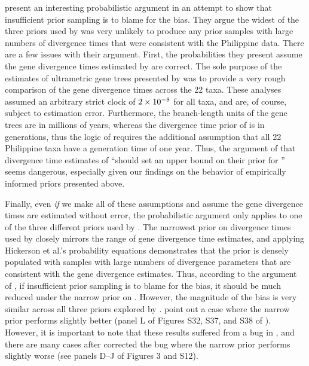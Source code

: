 \documentclass[letterpaper,12pt]{article}
\begin{document}
\begin{linenumbers}
\citet{Hickerson2013} present an interesting probabilistic argument in an
attempt to show that insufficient prior sampling is to blame for the bias.
They argue the widest of the three priors used by \citet{Oaks2012} was very
unlikely to produce any prior samples with large numbers of divergence times
that were consistent with the Philippine data.
There are a few issues with their argument.
First, the probabilities they present assume the gene divergence times
estimated by \citet{Oaks2012} are correct.
The sole purpose of the estimates of ultrametric gene trees presented by
\citet{Oaks2012} was to provide a very rough comparison of the gene divergence
times across the 22 taxa.  These analyses assumed an arbitrary strict clock of
$2\times 10^{-8}$ for all taxa, and are, of course, subject to estimation error.
Furthermore, the branch-length units of the gene trees are in millions of
years, whereas the divergence time prior of \msb is in generations, thus the
logic of \citet{Hickerson2013} requires the additional assumption that all 22
Philippine taxa have a generation time of one year.
Thus, the argument of \citet{Hickerson2013} that divergence time estimates of
\citet{Oaks2012} ``should set an upper bound on their prior for \divt{}'' seems
dangerous, especially given our findings on the behavior of empirically
informed priors presented above.

Finally, even \emph{if} we make all of these assumptions and assume the gene
divergence times are estimated without error, the probabilistic argument only
applies to one of the three different priors used by \citet{Oaks2012}.
The narrowest prior on divergence times used by \citet{Oaks2012} closely mirrors
the range of gene divergence time estimates, and applying Hickerson et al.'s
\citeyear{Hickerson2013} probability equations demonstrates that the prior
is densely populated with samples with large numbers of divergence parameters
that are consistent with the gene divergence estimates.
Thus, according to the argument of \citet{Hickerson2013}, if insufficient prior
sampling is to blame for the bias, it should be much reduced under the narrow
prior on \divt{}.
However, the magnitude of the bias is very similar across all three priors
explored by \citet{Oaks2012}.
\citet{Hickerson2013} point out a case where the narrow prior performs
slightly better (panel L of Figures S32, S37, and S38 of \citet{Oaks2012}).
However, it is important to note that these results suffered from a bug
in \msb, and there are many cases after \citet{Oaks2012} corrected the 
bug where the narrow prior performs slightly worse (see panels D--J of
Figures 3 and S12).


\end{linenumbers}
\end{document}
